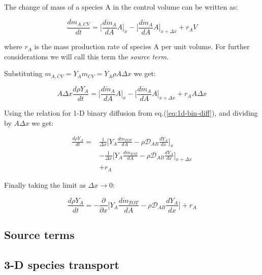 \documentclass[10pt,twocolumn]{article}
\begin{document}
The change of mass of a species A in the control volume can be written as:

\begin{equation}
\frac{d m_{A, CV} }{dt} = \Big[ \frac{d \dot{m}_A}{d A} A \Big]_x - \Big[ \frac{d \dot{m}_A}{d A} A \Big]_{x + \Delta x} + r_A V
\end{equation}

where $r_A$ is the mass production rate of species A per unit volume. For further considerations we will call this term the \textit{source term}.

Substituting $m_{A, CV} = Y_A m_{CV} = Y_A \rho A \Delta x$ we get:

\begin{equation}
A \Delta x \frac{d \rho Y_{A} }{dt} = \Big[ \frac{d \dot{m}_A}{d A} A \Big]_x - \Big[ \frac{d \dot{m}_A}{d A} A \Big]_{x + \Delta x} + r_A A \Delta x
\end{equation}

Using the relation for 1-D binary diffusion from eq.(\ref{eq:1d-bin-diff}), and dividing by $A \Delta x$ we get:

\begin{equation}
\begin{aligned}
\frac{d \rho Y_{A} }{dt} = & \frac{1}{\Delta x}\Big[ Y_A \frac{d \dot{m}_{TOT}}{d A} - \rho \mathcal{D}_{AB} \frac{dY_A}{dx} \Big]_x \\
& - \frac{1}{\Delta x} \Big[ Y_A \frac{d \dot{m}_{TOT}}{d A} - \rho \mathcal{D}_{AB} \frac{dY_A}{dx} \Big]_{x + \Delta x} \\
& + r_A
\end{aligned}
\end{equation}

Finally taking the limit as $\Delta x \rightarrow 0$:

\begin{equation}
\frac{d \rho Y_{A} }{dt} = - \frac{\partial}{\partial x}\Big[ Y_A \frac{d \dot{m}_{TOT}}{d A} - \rho \mathcal{D}_{AB} \frac{dY_A}{dx} \Big] + r_A
\end{equation}






\subsection{Source terms}

\subsection{3-D species transport}
\end{document}
